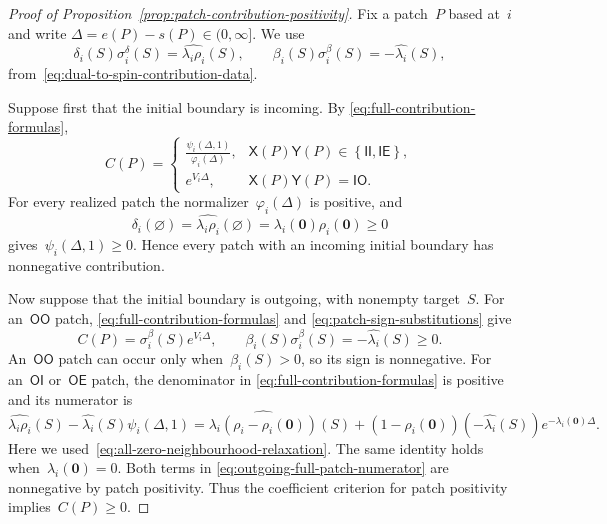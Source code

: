 \documentclass[EJP,preprint,NODS,nobera]{ejpecp}
\newcommand{\bb}[1]{\left(#1\right)}
\newcommand{\cb}[1]{\left\{#1\right\}}
\newcommand{\mb}[1]{\mathbf{#1}}
\newcommand{\rev}[1]{{\color{red}#1}}
\begin{document}
\begin{proof}[Proof of Proposition~\ref{prop:patch-contribution-positivity}]
Fix a patch~$P$ based at~$i$ and write
$\Delta=e(P)-s(P)\in(0,\infty]$. We use
\begin{equation}
\label{eq:patch-sign-substitutions}
\delta_i(S)\sigma_i^\delta(S)
=
\widehat{\lambda_i\rho_i}(S),
\qquad
\beta_i(S)\sigma_i^\beta(S)
=
-\widehat{\lambda_i}(S),
\end{equation}
from~\eqref{eq:dual-to-spin-contribution-data}.

Suppose first that the initial boundary is incoming. By
\eqref{eq:full-contribution-formulas},
\begin{equation*}
C(P)
=
\begin{cases}
\displaystyle
\frac{\psi_i(\Delta,1)}{\varphi_i(\Delta)},
&\mathsf X(P)\mathsf Y(P)\in\cb{\mathsf{II},\mathsf{IE}},
\\[1em]
e^{V_i\Delta},
&\mathsf X(P)\mathsf Y(P)=\mathsf{IO}.
\end{cases}
\end{equation*}
For every realized patch the normalizer~$\varphi_i(\Delta)$ is positive, and
\begin{equation*}
\delta_i(\varnothing)
=
\widehat{\lambda_i\rho_i}(\varnothing)
=
\lambda_i(\mb 0)\rho_i(\mb 0)
\geq0
\end{equation*}
gives~$\psi_i(\Delta,1)\geq0$. Hence every patch with an incoming
initial boundary has nonnegative contribution.

Now suppose that the initial boundary is outgoing, with nonempty target~$S$.
For an~$\mathsf{OO}$ patch,
\eqref{eq:full-contribution-formulas} and
\eqref{eq:patch-sign-substitutions} give
\begin{equation*}
C(P)
=
\sigma_i^\beta(S)e^{V_i\Delta},
\qquad
\beta_i(S)\sigma_i^\beta(S)
=
-\widehat{\lambda_i}(S)
\geq0.
\end{equation*}
An~$\mathsf{OO}$ patch can occur only when~$\beta_i(S)>0$, so its sign is
nonnegative. For an~$\mathsf{OI}$ or~$\mathsf{OE}$ patch, the denominator in
\eqref{eq:full-contribution-formulas} is positive and its numerator is
\begin{equation}
\widehat{\lambda_i\rho_i}(S)
-
\widehat{\lambda_i}(S)\psi_i(\Delta,1)
=
\widehat{\lambda_i\bb{\rho_i-\rho_i(\mb 0)}}(S)
+
\bb{1-\rho_i(\mb 0)}
\bb{-\widehat{\lambda_i}(S)}
e^{-\lambda_i(\mb 0)\Delta}.
\label{eq:outgoing-full-patch-numerator}
\end{equation}
Here we used~\eqref{eq:all-zero-neighbourhood-relaxation}. The same identity
holds when~$\lambda_i(\mb 0)=0$. Both terms in
\eqref{eq:outgoing-full-patch-numerator} are nonnegative by patch positivity. Thus the coefficient criterion for patch positivity \rev{implies}~$C(P)\geq 0$.


\end{proof}
\end{document}
